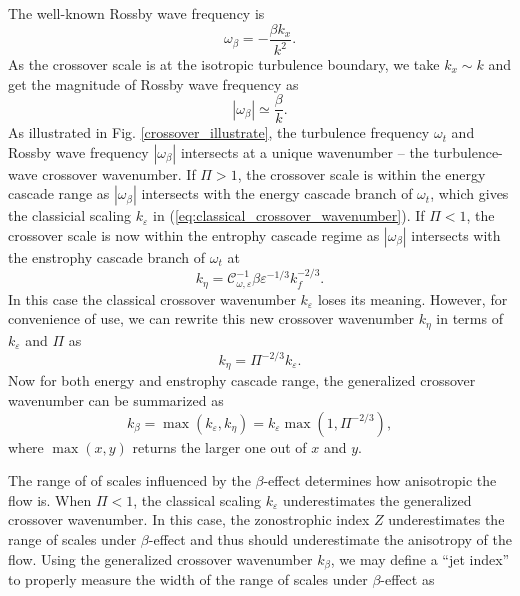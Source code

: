 \documentclass{ametsoc}
\begin{document}
The well-known Rossby wave frequency is 
\begin{equation}
\omega_{\beta}=-\frac{\beta k_{x}}{k^{2}}.\label{eq:Rossby_wave_freq_kx_k}
\end{equation}
As the crossover scale is at the isotropic turbulence boundary, we
take $k_{x}\sim k$ and get the magnitude of Rossby wave frequency as
\begin{equation}
|\omega_{\beta}|\simeq\frac{\beta}{k}.\label{eq:Rossby_wave_freq_k}
\end{equation}
As illustrated in Fig. \ref{crossover_illustrate}, the turbulence frequency
$\omega_{t}$ and Rossby wave frequency $|\omega_{\beta}|$ intersects at a
unique wavenumber -- the turbulence-wave crossover wavenumber.
If $\Pi>1$, the crossover scale is within the energy cascade range as
$|\omega_\beta|$ intersects with the energy cascade branch of $\omega_t$,
which gives the classicial scaling $k_\varepsilon$ in (\ref{eq:classical_crossover_wavenumber}).
If $\Pi<1$, the crossover scale is now within the entrophy cascade regime
as $|\omega_\beta|$ intersects with the enstrophy cascade branch of $\omega_t$
at 
\begin{equation}
k_{\eta}=\mathcal{C}_{\omega,\varepsilon}^{-1}\beta\varepsilon^{-1/3}k_{f}^{-2/3}.\label{eq:crossover_k_enstrophy_branch}
\end{equation}
In this case the classical crossover wavenumber $k_\varepsilon$ loses its meaning.
However, for convenience of use, we can rewrite this new crossover wavenumber $k_\eta$
in terms of $k_\varepsilon$ and $\Pi$ as
\begin{equation}
k_{\eta}=\Pi^{-2/3}k_{\varepsilon}.\label{eq:k_eta_k_epsilon_relation}
\end{equation}
Now for both energy and enstrophy cascade range, the generalized crossover wavenumber
can be summarized as
\begin{equation}
k_{\beta}=\max(k_{\varepsilon},k_{\eta})=k_{\varepsilon}\max(1,\Pi^{-2/3}),\label{eq:generalized_crossover_wavenumber}
\end{equation}
where $\max(x,y)$ returns the larger one out of $x$ and $y$. 

The range of of scales influenced by the $\beta$-effect determines
how anisotropic the flow is. When $\Pi<1$, the classical scaling
$k_{\varepsilon}$ underestimates the generalized crossover wavenumber.
In this case, the zonostrophic index $Z$ underestimates the range
of scales under $\beta$-effect and thus should underestimate the anisotropy
of the flow. Using the generalized crossover wavenumber $k_{\beta}$,
we may define a ``jet index'' to properly measure the width of the
range of scales under $\beta$-effect as
\end{document}
